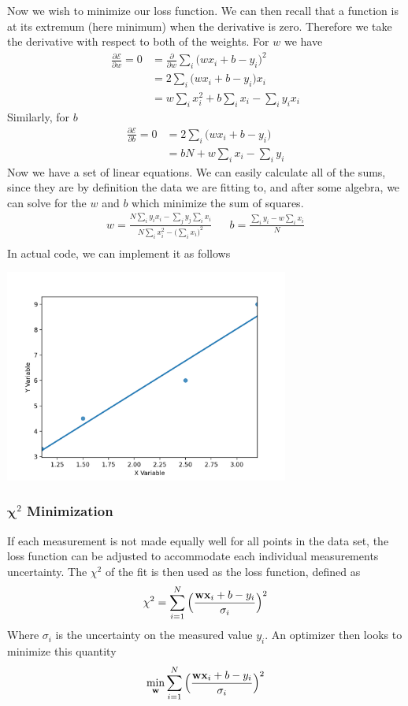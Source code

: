 Now we wish to minimize our loss function. We can then recall that a function is at its extremum (here minimum) when the derivative is zero. Therefore we take the derivative with respect to both of the weights. For $w$ we have
\begin{align}
\frac{\partial \mathcal{E}}{\partial w} = 0 &= \frac{\partial}{\partial w} \sum_i \Big(wx_i + b - y_i \Big)^2 \\
&= 2\sum_i \Big(wx_i + b - y_i\Big)x_i\\
&= w\sum_ix_i^2 + b\sum_i x_i -\sum_i y_i x_i 
\end{align}
Similarly, for $b$
\begin{align}
\frac{\partial \mathcal{E}}{\partial b} = 0 &= 2\sum_i \Big(wx_i + b - y_i\Big)\\
&= bN + w \sum_i x_i - \sum_i y_i 
\end{align}
Now we have a set of linear equations. We can easily calculate all of the sums, since they are by definition the data we are fitting to, and after some algebra, we can solve for the $w$ and $b$ which minimize the sum of squares.
\begin{align}
w = \frac{N\sum_i y_i x_i  - \sum_j y_j \sum_i x_i }{N\sum_i x_i^2 -\Big(\sum_i x_i\Big)^2}
&&b = \frac{\sum_i y_i - w \sum_i x_i}{N}\\
\end{align}
In actual code, we can implement it as follows




\centerline{\includegraphics[width=0.7\textwidth]{mathematics/fig/linearRegressionExact.png}}

\subsubsection{$\boldsymbol{\chi}^2$ Minimization}
If each measurement is not made equally well for all points in the data set, the loss function can be adjusted to accommodate each individual measurements uncertainty. The $\chi^2$ of the fit is then used as the loss function, defined as
 \begin{align}
    	\chi^2 = \sum_{i=1}^N\Big(\frac{\textbf{wx}_i +b - y_i}{\sigma_i}\Big)^2
\end{align}
Where $\sigma_i$ is the uncertainty on the measured value $y_i$. An optimizer then looks to minimize this quantity
\begin{align}
    \min_{\textbf{w}}  \sum_{i=1}^N\Big(\frac{\textbf{wx}_i +b - y_i}{\sigma_i}\Big)^2
\end{align}



